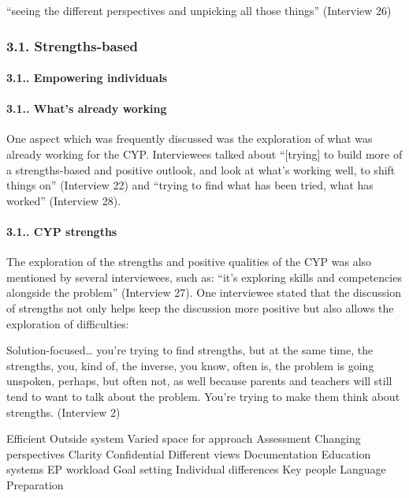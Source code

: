 \documentclass[
]{article}
\begin{document}
``seeing the different perspectives and unpicking all those things''
(Interview 26)

\hypertarget{strengths-based}{%
\subsubsection{3.1. Strengths-based}\label{strengths-based}}

\hypertarget{empowering-individuals}{%
\paragraph{3.1.. Empowering individuals}\label{empowering-individuals}}

\hypertarget{whats-already-working}{%
\paragraph{3.1.. What's already working}\label{whats-already-working}}

One aspect which was frequently discussed was the exploration of what
was already working for the CYP. Interviewees talked about
``{[}trying{]} to build more of a strengths-based and positive outlook,
and look at what's working well, to shift things on'' (Interview 22) and
``trying to find what has been tried, what has worked'' (Interview 28).

\hypertarget{cyp-strengths}{%
\paragraph{3.1.. CYP strengths}\label{cyp-strengths}}

The exploration of the strengths and positive qualities of the CYP was
also mentioned by several interviewees, such as: ``it's exploring skills
and competencies alongside the problem'' (Interview 27). One interviewee
stated that the discussion of strengths not only helps keep the
discussion more positive but also allows the exploration of
difficulties:

Solution-focused\ldots{} you're trying to find strengths, but at the
same time, the strengths, you, kind of, the inverse, you know, often is,
the problem is going unspoken, perhaps, but often not, as well because
parents and teachers will still tend to want to talk about the problem.
You're trying to make them think about strengths. (Interview 2)

Efficient Outside system Varied space for approach Assessment Changing
perspectives Clarity Confidential Different views Documentation
Education systems EP workload Goal setting Individual differences Key
people Language Preparation
\end{document}
